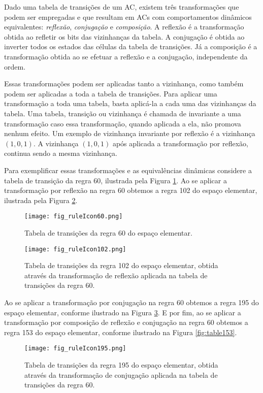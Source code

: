 Dado uma tabela de transições de um AC, existem três transformações que podem ser empregadas e que resultam em ACs com comportamentos dinâmicos equivalentes: \textit{reflexão}, \textit{conjugação} e \textit{composição}. A reflexão é a transformação obtida ao refletir os bits das vizinhanças da tabela. A conjugação é obtida ao inverter todos os estados das células da tabela de transições. Já a composição é a transformação obtida ao se efetuar a reflexão e a conjugação, independente da ordem.

Essas transformações podem ser aplicadas tanto a vizinhança, como também podem ser aplicadas a toda a tabela de transições. Para aplicar uma transformação a toda uma tabela, basta aplicá-la a cada uma das vizinhanças da tabela. Uma tabela, transição ou vizinhança é chamada de invariante a uma transformação caso essa transformação, quando aplicada a ela, não promova nenhum efeito. Um exemplo de vizinhança invariante por reflexão é a vizinhança $(1,0,1)$. A vizinhança $(1,0,1)$ após aplicada a transformação por reflexão, continua sendo a mesma vizinhança.

Para exemplificar essas transformações e as equivalências dinâmicas considere a tabela de transição da regra 60, ilustrada pela Figura \ref{fig:table60}. Ao se aplicar a transformação por reflexão na regra 60 obtemos a regra 102 do espaço elementar, ilustrada pela Figura \ref{fig:table102}.

	\begin{figure}[h!]
	  \centering
	  \texttt{[image: fig\_ruleIcon60.png]}
	  \caption{Tabela de transições da regra 60 do espaço elementar.}
	  \label{fig:table60}
	\end{figure}

	\begin{figure}[h!]
	  \centering
	  \texttt{[image: fig\_ruleIcon102.png]}
	  \caption{Tabela de transições da regra 102 do espaço elementar, obtida através da transformação de reflexão aplicada na tabela de transições da regra 60.}
	  \label{fig:table102}
	\end{figure}

Ao se aplicar a transformação por conjugação na regra 60 obtemos a regra 195 do espaço elementar, conforme ilustrado na Figura \ref{fig:table195}. E por fim, ao se aplicar a transformação por composição de reflexão e conjugação na regra 60 obtemos a regra 153 do espaço elementar, conforme ilustrado na Figura \ref{fig:table153}.

	\begin{figure}[h!]
	  \centering
	  \texttt{[image: fig\_ruleIcon195.png]}
	  \caption{Tabela de transições da regra 195 do espaço elementar, obtida através da transformação de conjugação aplicada na tabela de transições da regra 60.}
	  \label{fig:table195}
	\end{figure}

